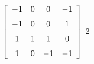 {$\left[ \begin {array}{cccc} -1&0&0&-1\\\noalign{\medskip}-1&0&0&1
\\\noalign{\medskip}1&1&1&0\\\noalign{\medskip}1&0&-1&-1\end {array}\right] 
$} 
{$2$}

  

 

